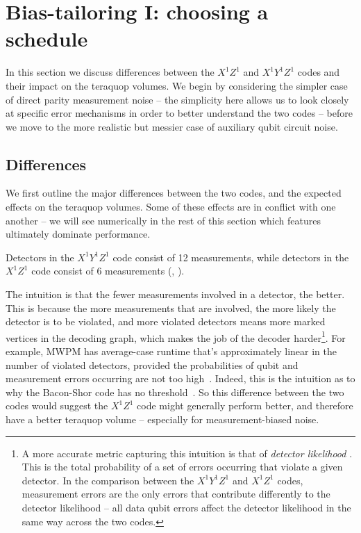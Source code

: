 \section{Bias-tailoring I: choosing a schedule}\label{sec:choosing-a-schedule}

In this section we discuss differences between the $X^1Z^1$ and $X^1Y^1Z^1$ codes and their impact on the teraquop volumes.
We begin by considering the simpler case of direct parity measurement noise -- the simplicity here allows us to look closely at specific error mechanisms in order to better understand the two codes -- before we move to the more realistic but messier case of auxiliary qubit circuit noise.

\subsection{Differences}\label{subsec:differences}

We first outline the major differences between the two codes, and the expected effects on the teraquop volumes.
Some of these effects are in conflict with one another -- we will see numerically in the rest of this section which features ultimately dominate performance.

\begin{difference}\label{dif:XYZ_XZ_meas_per_detector}
    Detectors in the $X^1 Y^1 Z^1$ code consist of 12 measurements, while detectors in the $X^1 Z^1$ code consist of 6 measurements (, ).
\end{difference}

The intuition is that the fewer measurements involved in a detector, the better.
This is because the more measurements that are involved, the more likely the detector is to be violated,
and more violated detectors means more marked vertices in the decoding graph,
which makes the job of the decoder harder\footnote{A more accurate metric capturing this intuition is that of \textit{detector likelihood} \cite{hesner2024using}. This is the total probability of a set of errors occurring that violate a given detector. In the comparison between the $X^1 Y^1 Z^1$ and $X^1 Z^1$ codes, measurement errors are the only errors that contribute differently to the detector likelihood -- all data qubit errors affect the detector likelihood in the same way across the two codes.}.
For example, MWPM has average-case runtime that's
approximately linear in the number of violated detectors,
provided the probabilities of qubit and measurement errors occurring are not too high~\cite{higgott2025sparse}.
Indeed, this is the intuition as to why the Bacon-Shor code has no threshold~\cite{gidney2023baconthreshold}.
So this difference between the two codes would suggest the $X^1 Z^1$ code might generally perform better, and therefore have a better teraquop volume -- especially for measurement-biased noise.

